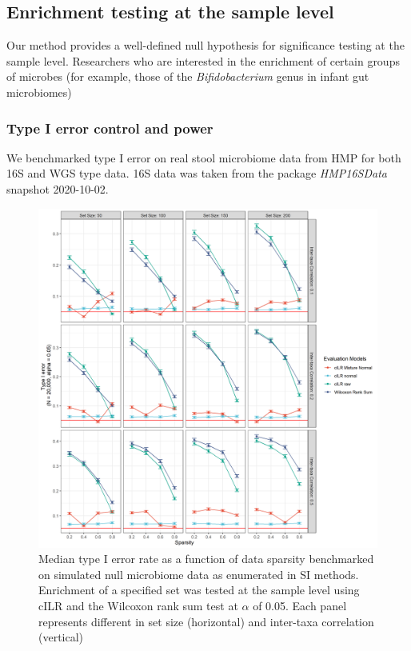 \documentclass{article}
\begin{document}
\subsection*{Enrichment testing at the sample level}
Our method provides a well-defined null hypothesis for significance testing at the sample level. Researchers who are interested in the enrichment of certain groups of microbes (for example, those of the \emph{Bifidobacterium} genus in infant gut microbiomes)  
\subsubsection*{Type I error control and power}
We benchmarked type I error on real stool microbiome data from HMP for both 16S and WGS type data. 16S data was taken from the package \emph{HMP16SData} snapshot 2020-10-02. 



\begin{figure}[H]
    \centering
    \includegraphics[scale = 0.4]{figures/fdr_single_sample.png}
    \caption{Median type I error rate as a function of data sparsity benchmarked on simulated null microbiome data as enumerated in SI methods. Enrichment of a specified set was tested at the sample level using cILR and the Wilcoxon rank sum test at $\alpha$ of 0.05. Each panel represents different in set size (horizontal) and inter-taxa correlation (vertical)}
\end{figure}
\end{document}
